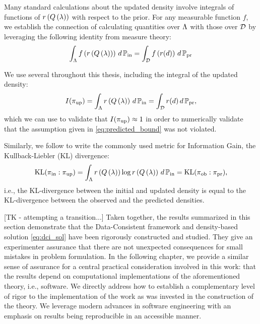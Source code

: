 Many standard calculations about the updated density involve integrals of functions of $r\left ( Q\left ( \lambda \right ) \right )$ with respect to the prior.
For any measurable function $f$, we establish the connection of calculating quantities over ${\Lambda}$ with those over $\mathcal{D}$ by leveraging the following identity from measure theory:
\[
\int_{\Lambda} f\left( r\left ( Q\left ( \lambda \right ) \right ) \right ) \, d\operatorname*{\mathbb{P}_{in}} = \int_{\mathcal{D}} f\left( r(d) \right ) \, d\operatorname*{\mathbb{P}_{pr}}
\]

We use several throughout this thesis, including the integral of the updated density:
\[
I(\operatorname*{\pi_{up}} ) = \int_{\Lambda} r\left ( Q\left ( \lambda \right ) \right ) \, d\operatorname*{\mathbb{P}_{in}} = \int_{\mathcal{D}} r(d) \, d\operatorname*{\mathbb{P}_{pr}} ,
\]
which we can use to validate that $I(\operatorname*{\pi_{up}}) \approx 1$ in order to numerically validate that the assumption given in \eqref{eq:predicted_bound} was not violated.

Similarly, we follow \cite{BJW18} to write the commonly used metric for Information Gain, the Kullback-Liebler (KL) divergence:
\begin{equation}\label{eq:KLdiv}
\text{KL}(\operatorname*{\pi_{in}} : \operatorname*{\pi_{up}} ) = \int_{\Lambda} r\left ( Q\left ( \lambda \right ) \right ) \log r\left ( Q\left ( \lambda \right ) \right ) \, d\operatorname*{\mathbb{P}_{in}} = \text{KL}(\operatorname*{\pi_{ob}} : \operatorname*{\pi_{pr}} ),
\end{equation}
i.e., the KL-divergence between the initial and updated density is equal to the KL-divergence between the observed and the predicted densities.

[TK - attempting a transition...]
Taken together, the results summarized in this section demonstrate that the Data-Consistent framework and density-based solution \eqref{eq:dci_sol} have been rigorously constructed and studied.
They give an experimenter assurance that there are not unexpected consequences for small mistakes in problem formulation.
In the following chapter, we provide a similar sense of assurance for a central practical consideration involved in this work: that the results depend on computational implementations of the aforementioned theory, i.e., software.
We directly address how to establish a complementary level of rigor to the implementation of the work as was invested in the construction of the theory.
We leverage modern advances in software engineering with an emphasis on results being reproducible in an accessible manner.

